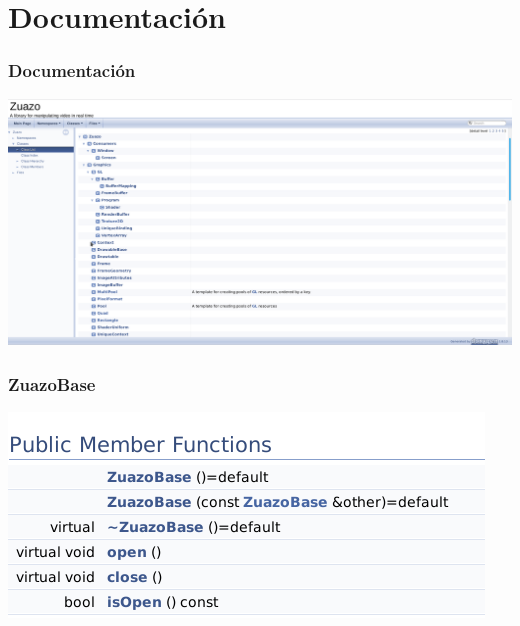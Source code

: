 \documentclass{beamer}
\begin{document}
%
%
\section{Documentación}

\begin{frame} \frametitle{Documentación}
	\includegraphics[width=\textwidth]{doxy1} 
\end{frame}

\begin{frame}[allowframebreaks] \frametitle{ZuazoBase}
	\center\includegraphics[width=\textwidth]{zuazo_base} 
\end{frame}
\end{document}
